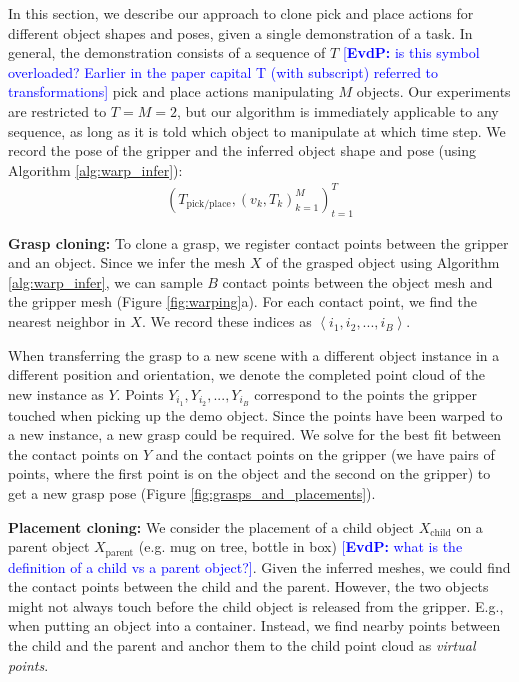 \documentclass{article}
\newcommand{\evdp}[1]{\textcolor{blue}{[\textbf{EvdP:} #1]}}
\begin{document}
In this section, we describe our approach to clone pick and place actions for different object shapes and poses, given a single demonstration of a task. In general, the demonstration consists of a sequence of $T$ \evdp{is this symbol overloaded? Earlier in the paper capital T (with subscript) referred to transformations} pick and place actions manipulating $M$ objects. Our experiments are restricted to $T=M=2$, but our algorithm is immediately applicable to any sequence, as long as it is told which object to manipulate at which time step. We record the pose of the gripper and the inferred object shape and pose (using Algorithm \ref{alg:warp_infer}):
\begin{align}
    \left(T_{\text{pick/place}}, (v_k, T_k)_{k=1}^M\right)_{t=1}^T
\end{align}

\textbf{Grasp cloning:} To clone a grasp, we register contact points between the gripper and an object. Since we infer the mesh $X$ of the grasped object using Algorithm \ref{alg:warp_infer}, we can sample $B$ contact points between the object mesh and the gripper mesh (Figure \ref{fig:warping}a). For each contact point, we find the nearest neighbor in $X$. We record these indices as $\left< i_1, i_2, ..., i_B \right>$.

When transferring the grasp to a new scene with a different object instance in a different position and orientation, we denote the completed point cloud of the new instance as $Y$. Points $Y_{i_1}, Y_{i_2}, ..., Y_{i_B}$ correspond to the points the gripper touched when picking up the demo object. Since the points have been warped to a new instance, a new grasp could be required. We solve for the best fit between the contact points on $Y$ and the contact points on the gripper (we have pairs of points, where the first point is on the object and the second on the gripper) to get a new grasp pose (Figure \ref{fig:grasps_and_placements}).

\textbf{Placement cloning:} We consider the placement of a child object $X_{\mathrm{child}}$ on a parent object $X_{\mathrm{parent}}$ (e.g. mug on tree, bottle in box) \evdp{what is the definition of a child vs a parent object?}. Given the inferred meshes, we could find the contact points between the child and the parent. However, the two objects might not always touch before the child object is released from the gripper. E.g., when putting an object into a container. Instead, we find nearby points between the child and the parent and anchor them to the child point cloud as \textit{virtual points}.
\end{document}
